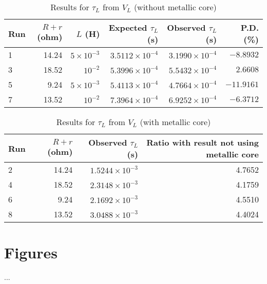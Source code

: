 \begin{table}[ht]
    \begin{center}
        \begin{tabular}{|l|r|r|r|r|r|}
            \hline
            Run & $R+r$ (ohm) & $L$ (H) & Expected $\tau_{L}$ (s) & Observed $\tau_{L}$ (s) & P.D. (\%) \\
            \hline
            1 & 14.24 & $5 \times 10^{-3}$ & $3.5112 \times 10^{-4}$ & $3.1990 \times 10^{-4}$ & $-8.8932$ \\
            3 & 18.52 & $10^{-2}$ & $5.3996 \times 10^{-4}$ & $5.5432 \times 10^{-4}$ & $2.6608$ \\
            5 & 9.24 & $5 \times 10^{-3}$ & $5.4113 \times 10^{-4}$ & $4.7664 \times 10^{-4}$ & $-11.9161$ \\
            7 & 13.52 & $10^{-2}$ & $7.3964 \times 10^{-4}$ & $6.9252 \times 10^{-4}$ & $-6.3712$ \\
            \hline
        \end{tabular}
    \end{center}
    \caption{Results for $\tau_{L}$ from $V_{L}$ (without metallic core)}
\end{table}
\begin{table}[ht]
    \begin{center}
        \begin{tabular}{|l|r|r|r|}
            \hline
            Run & $R+r$ (ohm) & Observed $\tau_{L}$ (s) & Ratio with result not using metallic core \\
            \hline
            2 & 14.24 & $1.5244 \times 10^{-3}$ & 4.7652 \\
            4 & 18.52 & $2.3148 \times 10^{-3}$ & 4.1759 \\
            6 & 9.24 & $2.1692 \times 10^{-3}$ & 4.5510 \\
            8 & 13.52 & $3.0488 \times 10^{-3}$ & 4.4024 \\
            \hline
        \end{tabular}
    \end{center}
    \caption{Results for $\tau_{L}$ from $V_{L}$ (with metallic core)}
\end{table}
\newpage
\section{Figures}
...
